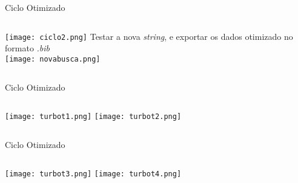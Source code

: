 \begin{frame}[t]{Ciclo Otimizado}
    
    \begin{columns}
            \centering
            \texttt{[image: ciclo2.png]}
            \centering
            Testar a nova \emph{string}, e exportar os dados otimizado no formato \emph{.bib}\\

            \vspace*{0.2cm}
            \texttt{[image: novabusca.png]}
    \end{columns}

\end{frame}
\begin{frame}[c]{Ciclo Otimizado}
    
    \begin{columns}
            \centering
            \texttt{[image: turbot1.png]}
            \centering
            \texttt{[image: turbot2.png]}

    \end{columns}

\end{frame}
\begin{frame}[c]{Ciclo Otimizado}
    
    \begin{columns}
            \centering
            \texttt{[image: turbot3.png]}
            \centering
            \texttt{[image: turbot4.png]}

    \end{columns}

\end{frame}
